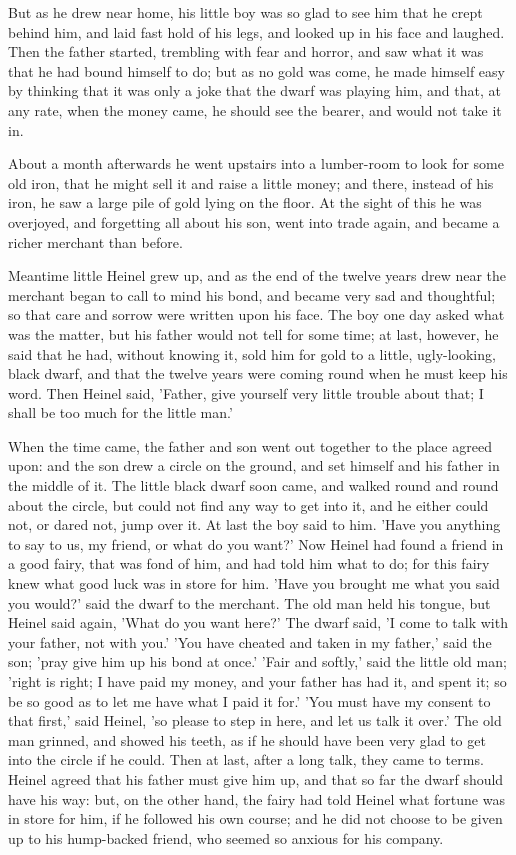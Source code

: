 \documentclass[12pt]{book}
\begin{document}
But as he drew near home, his little boy was so glad to see him that
he crept behind him, and laid fast hold of his legs, and looked up in
his face and laughed. Then the father started, trembling with fear and
horror, and saw what it was that he had bound himself to do; but as no
gold was come, he made himself easy by thinking that it was only a
joke that the dwarf was playing him, and that, at any rate, when the
money came, he should see the bearer, and would not take it in.

About a month afterwards he went upstairs into a lumber-room to look
for some old iron, that he might sell it and raise a little money; and
there, instead of his iron, he saw a large pile of gold lying on the
floor. At the sight of this he was overjoyed, and forgetting all about
his son, went into trade again, and became a richer merchant than
before.

Meantime little Heinel grew up, and as the end of the twelve years
drew near the merchant began to call to mind his bond, and became very
sad and thoughtful; so that care and sorrow were written upon his
face. The boy one day asked what was the matter, but his father would
not tell for some time; at last, however, he said that he had, without
knowing it, sold him for gold to a little, ugly-looking, black dwarf,
and that the twelve years were coming round when he must keep his
word. Then Heinel said, 'Father, give yourself very little trouble
about that; I shall be too much for the little man.'

When the time came, the father and son went out together to the place
agreed upon: and the son drew a circle on the ground, and set himself
and his father in the middle of it. The little black dwarf soon came,
and walked round and round about the circle, but could not find any
way to get into it, and he either could not, or dared not, jump over
it. At last the boy said to him. 'Have you anything to say to us, my
friend, or what do you want?' Now Heinel had found a friend in a good
fairy, that was fond of him, and had told him what to do; for this
fairy knew what good luck was in store for him. 'Have you brought me
what you said you would?' said the dwarf to the merchant. The old man
held his tongue, but Heinel said again, 'What do you want here?' The
dwarf said, 'I come to talk with your father, not with you.' 'You have
cheated and taken in my father,' said the son; 'pray give him up his
bond at once.' 'Fair and softly,' said the little old man; 'right is
right; I have paid my money, and your father has had it, and spent it;
so be so good as to let me have what I paid it for.' 'You must have my
consent to that first,' said Heinel, 'so please to step in here, and
let us talk it over.' The old man grinned, and showed his teeth, as if
he should have been very glad to get into the circle if he could. Then
at last, after a long talk, they came to terms. Heinel agreed that his
father must give him up, and that so far the dwarf should have his
way: but, on the other hand, the fairy had told Heinel what fortune
was in store for him, if he followed his own course; and he did not
choose to be given up to his hump-backed friend, who seemed so anxious
for his company.
\end{document}
